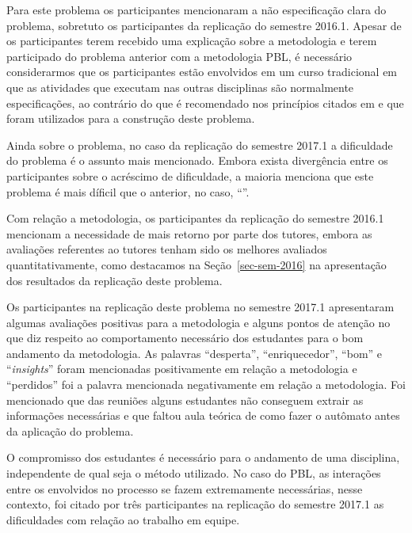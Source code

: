 Para este problema os participantes mencionaram a não especificação clara
do problema, sobretuto os participantes da replicação do semestre 2016.1.
Apesar de os participantes terem recebido
uma explicação sobre a metodologia e terem participado
do problema anterior com a metodologia PBL, é necessário considerarmos
que os participantes estão envolvidos em um curso tradicional
em que as atividades que executam nas outras disciplinas são normalmente
especificações, ao contrário do que é recomendado nos princípios citados
em \cite{dolmans1997seven} e que foram utilizados para
a construção deste problema.

Ainda sobre o problema, no caso da replicação do semestre 2017.1 a dificuldade
do problema é o assunto mais mencionado.
Embora exista divergência entre os participantes
sobre o acréscimo de dificuldade, a maioria menciona que este
problema é mais díficil que o anterior, no caso, ``\ProblemaG''.

Com relação a metodologia, os participantes da replicação do semestre 2016.1
mencionam a necessidade de mais retorno por parte dos tutores,
embora as avaliações referentes ao tutores tenham sido
os melhores avaliados quantitativamente, como destacamos
na Seção~\ref{sec-sem-2016} na apresentação dos resultados
da replicação deste problema.

Os participantes na replicação deste problema no semestre 2017.1
apresentaram algumas avaliações positivas para a metodologia
e alguns pontos de atenção no que diz respeito ao
comportamento necessário dos estudantes para o bom
andamento da metodologia.
As palavras ``desperta'', ``enriquecedor'', ``bom'' e ``\textit{insights}''
foram mencionadas positivamente em relação a metodologia e ``perdidos''
foi a palavra mencionada negativamente em relação a metodologia.
Foi mencionado que das reuniões alguns estudantes não conseguem
extrair as informações necessárias e que faltou aula teórica
de como fazer o autômato antes da aplicação do problema.

O compromisso dos estudantes é necessário para
o andamento de uma disciplina, independente de qual seja
o método utilizado.
No caso do PBL, as interações entre os envolvidos no processo
se fazem extremamente necessárias, nesse contexto,
foi citado por três participantes na replicação do semestre 2017.1 as dificuldades
com relação ao trabalho em equipe.

\subsection{\ProblemaC}

